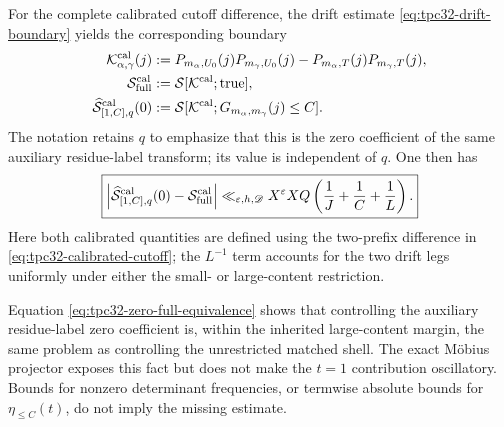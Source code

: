 For the complete calibrated cutoff difference, the drift estimate
\eqref{eq:tpc32-drift-boundary} yields the corresponding boundary
\begin{align}
 \mathcal K^{\mathrm{cal}}_{\alpha,\gamma}(j)
 &:=
 P_{m_\alpha,U_0}(j)P_{m_\gamma,U_0}(j)
 -P_{m_\alpha,T}(j)P_{m_\gamma,T}(j),
 \label{eq:tpc32-calibrated-shell-kernel}\\
 \mathcal S_{\mathrm{full}}^{\mathrm{cal}}
 &:=
 \mathcal S[\mathcal K^{\mathrm{cal}};\textup{true}],
 \notag\\
 \widehat{\mathcal S}^{\mathrm{cal}}_{[1,C],q}(0)
 &:=
 \mathcal S[\mathcal K^{\mathrm{cal}};G_{m_\alpha,m_\gamma}(j)\le C].
 \label{eq:tpc32-calibrated-zero-definition}
\end{align}
The notation retains \(q\) to emphasize that this is the zero
coefficient of the same auxiliary residue-label transform; its value
is independent of \(q\).  One then has
\begin{equation}
 \boxed{
 \left|
 \widehat{\mathcal S}^{\mathrm{cal}}_{[1,C],q}(0)
 -\mathcal S_{\mathrm{full}}^{\mathrm{cal}}
 \right|
 \ll_{\varepsilon,h,\mathscr D}
 X^\varepsilon XQ
 \left(\frac1J+\frac1C+\frac1L\right).}
 \label{eq:tpc32-calibrated-zero-full-equivalence}
\end{equation}
Here both calibrated quantities are defined using the two-prefix
difference in \eqref{eq:tpc32-calibrated-cutoff}; the \(L^{-1}\) term
accounts for the two drift legs uniformly under either the small- or
large-content restriction.

\begin{remark}
Equation \eqref{eq:tpc32-zero-full-equivalence} shows that controlling
the auxiliary residue-label zero coefficient is, within the inherited
large-content margin, the same problem as controlling the unrestricted
matched shell.  The exact M\"obius projector exposes this fact but does
not make the \(t=1\) contribution oscillatory.  Bounds for nonzero
determinant frequencies, or termwise absolute bounds for
\(\eta_{\le C}(t)\), do not imply the missing estimate.
\end{remark}
